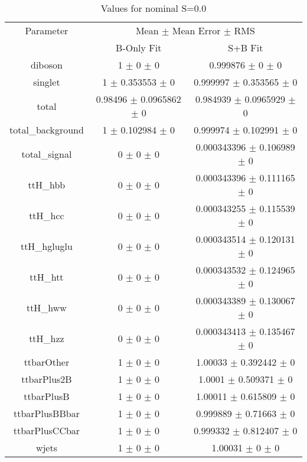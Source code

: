 \begin{table}
\centering
\caption{Values for nominal S=0.0}
\begin{tabular}{ccc}
\toprule
Parameter & \multicolumn{2}{c}{Mean $\pm$ Mean Error $\pm$ RMS}\\
 & B-Only Fit & S+B Fit\\
\midrule
diboson & \num{1} $\pm$ \num{0} $\pm$ \num{0} & \num{0.999876} $\pm$ \num{0} $\pm$ \num{0}\\
singlet & \num{1} $\pm$ \num{0.353553} $\pm$ \num{0} & \num{0.999997} $\pm$ \num{0.353565} $\pm$ \num{0}\\
total & \num{0.98496} $\pm$ \num{0.0965862} $\pm$ \num{0} & \num{0.984939} $\pm$ \num{0.0965929} $\pm$ \num{0}\\
total\_background & \num{1} $\pm$ \num{0.102984} $\pm$ \num{0} & \num{0.999974} $\pm$ \num{0.102991} $\pm$ \num{0}\\
total\_signal & \num{0} $\pm$ \num{0} $\pm$ \num{0} & \num{0.000343396} $\pm$ \num{0.106989} $\pm$ \num{0}\\
ttH\_hbb & \num{0} $\pm$ \num{0} $\pm$ \num{0} & \num{0.000343396} $\pm$ \num{0.111165} $\pm$ \num{0}\\
ttH\_hcc & \num{0} $\pm$ \num{0} $\pm$ \num{0} & \num{0.000343255} $\pm$ \num{0.115539} $\pm$ \num{0}\\
ttH\_hgluglu & \num{0} $\pm$ \num{0} $\pm$ \num{0} & \num{0.000343514} $\pm$ \num{0.120131} $\pm$ \num{0}\\
ttH\_htt & \num{0} $\pm$ \num{0} $\pm$ \num{0} & \num{0.000343532} $\pm$ \num{0.124965} $\pm$ \num{0}\\
ttH\_hww & \num{0} $\pm$ \num{0} $\pm$ \num{0} & \num{0.000343389} $\pm$ \num{0.130067} $\pm$ \num{0}\\
ttH\_hzz & \num{0} $\pm$ \num{0} $\pm$ \num{0} & \num{0.000343413} $\pm$ \num{0.135467} $\pm$ \num{0}\\
ttbarOther & \num{1} $\pm$ \num{0} $\pm$ \num{0} & \num{1.00033} $\pm$ \num{0.392442} $\pm$ \num{0}\\
ttbarPlus2B & \num{1} $\pm$ \num{0} $\pm$ \num{0} & \num{1.0001} $\pm$ \num{0.509371} $\pm$ \num{0}\\
ttbarPlusB & \num{1} $\pm$ \num{0} $\pm$ \num{0} & \num{1.00011} $\pm$ \num{0.615809} $\pm$ \num{0}\\
ttbarPlusBBbar & \num{1} $\pm$ \num{0} $\pm$ \num{0} & \num{0.999889} $\pm$ \num{0.71663} $\pm$ \num{0}\\
ttbarPlusCCbar & \num{1} $\pm$ \num{0} $\pm$ \num{0} & \num{0.999332} $\pm$ \num{0.812407} $\pm$ \num{0}\\
wjets & \num{1} $\pm$ \num{0} $\pm$ \num{0} & \num{1.00031} $\pm$ \num{0} $\pm$ \num{0}\\
\bottomrule
\end{tabular}
\end{table}